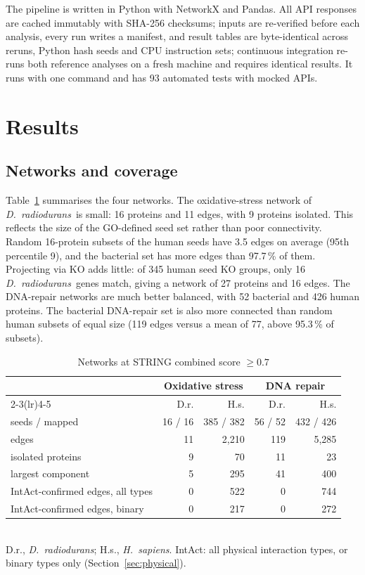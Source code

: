 \documentclass[conference]{IEEEtran}
\newcommand{\Dr}{\emph{D.~radiodurans}}
\begin{document}
The pipeline is written in Python with NetworkX \cite{networkx} and Pandas. All API responses are
cached immutably with SHA-256 checksums; inputs are re-verified before each analysis, every run
writes a manifest, and result tables are byte-identical across reruns, Python hash seeds and CPU
instruction sets; continuous integration re-runs both reference analyses on a fresh machine and
requires identical results. It runs with
one command and has 93 automated tests with mocked APIs.

\section{Results}

\subsection{Networks and coverage}

Table~\ref{tab:networks} summarises the four networks. The oxidative-stress network of \Dr\ is
small: 16 proteins and 11 edges, with 9 proteins isolated. This reflects the size of the GO-defined
seed set rather than poor connectivity. Random 16-protein subsets of the human seeds have 3.5 edges
on average (95th percentile 9), and the bacterial set has more edges than 97.7\,\% of them.
Projecting via KO adds little: of 345 human seed KO groups, only 16 \Dr\ genes match, giving a
network of 27 proteins and 16 edges. The DNA-repair networks are much better balanced, with 52
bacterial and 426 human proteins. The bacterial DNA-repair set is also more connected than random
human subsets of equal size (119 edges versus a mean of 77, above 95.3\,\% of subsets).

\begin{table}[t]
\centering
\caption{Networks at STRING combined score $\geq 0.7$}
\label{tab:networks}
\footnotesize
\setlength{\tabcolsep}{4pt}
\begin{tabular}{lrrrr}
\toprule
 & \multicolumn{2}{c}{Oxidative stress} & \multicolumn{2}{c}{DNA repair} \\
\cmidrule(lr){2-3}\cmidrule(lr){4-5}
 & D.r. & H.s. & D.r. & H.s. \\
\midrule
seeds / mapped & 16 / 16 & 385 / 382 & 56 / 52 & 432 / 426 \\
edges & 11 & 2,210 & 119 & 5,285 \\
isolated proteins & 9 & 70 & 11 & 23 \\
largest component & 5 & 295 & 41 & 400 \\
IntAct-confirmed edges, all types & 0 & 522 & 0 & 744 \\
IntAct-confirmed edges, binary & 0 & 217 & 0 & 272 \\
\bottomrule
\end{tabular}\\[3pt]
D.r., \emph{D.~radiodurans}; H.s., \emph{H.~sapiens}. IntAct: all physical interaction types, or
binary types only (Section~\ref{sec:physical}).
\end{table}
\end{document}
